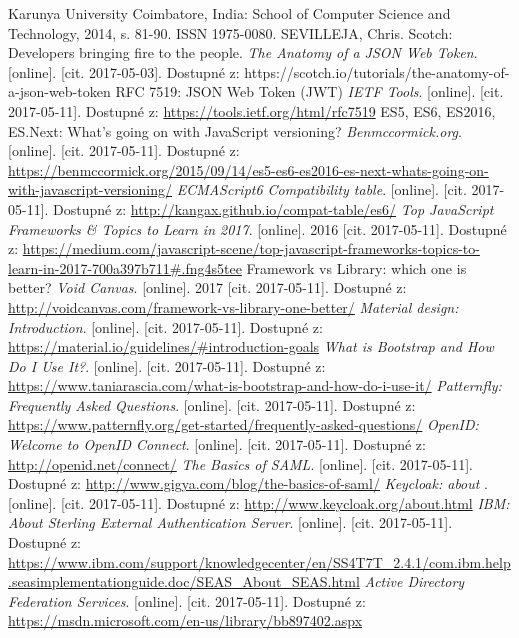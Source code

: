 \begin{thebibliography}{99}
Karunya University Coimbatore, India: School of Computer Science and Technology, 2014, s. 81-90. ISSN 1975-0080.
SEVILLEJA, Chris.
Scotch: Developers bringing fire to the people. \textit{The Anatomy of a JSON Web Token}.
[online]. [cit. 2017-05-03]. Dostupné z: https://scotch.io/tutorials/the-anatomy-of-a-json-web-token
RFC 7519: JSON Web Token (JWT)
\textit{IETF Tools}.
[online]. [cit. 2017-05-11]. Dostupné z: \url{https://tools.ietf.org/html/rfc7519}
ES5, ES6, ES2016, ES.Next: What's going on with JavaScript versioning?
\textit{Benmccormick.org}.
[online]. [cit. 2017-05-11]. Dostupné z: \url{https://benmccormick.org/2015/09/14/es5-es6-es2016-es-next-whats-going-on-with-javascript-versioning/}
\textit{ECMAScript6 Compatibility table}.
[online]. [cit. 2017-05-11]. Dostupné z: \url{http://kangax.github.io/compat-table/es6/}
\textit{Top JavaScript Frameworks \& Topics to Learn in 2017}.
[online]. 2016 [cit. 2017-05-11].  Dostupné z:  \url{https://medium.com/javascript-scene/top-javascript-frameworks-topics-to-learn-in-2017-700a397b711#.fng4s5tee}
Framework vs Library: which one is better?
\textit{Void Canvas}.
[online]. 2017 [cit. 2017-05-11]. Dostupné z: \url{http://voidcanvas.com/framework-vs-library-one-better/}
\textit{Material design: Introduction}.
[online]. [cit. 2017-05-11]. Dostupné z: \url{https://material.io/guidelines/#introduction-goals}
\textit{What is Bootstrap and How Do I Use It?}.
[online]. [cit. 2017-05-11]. Dostupné z: \url{https://www.taniarascia.com/what-is-bootstrap-and-how-do-i-use-it/}
\textit{Patternfly: Frequently Asked Questions}.
[online]. [cit. 2017-05-11]. Dostupné z: \url{https://www.patternfly.org/get-started/frequently-asked-questions/}
\textit{OpenID: Welcome to OpenID Connect}.
[online]. [cit. 2017-05-11]. Dostupné z: \url{http://openid.net/connect/}
\textit{The Basics of SAML}.
[online]. [cit. 2017-05-11]. Dostupné z: \url{http://www.gigya.com/blog/the-basics-of-saml/}
\textit{Keycloak: about }.
[online]. [cit. 2017-05-11]. Dostupné z: \url{http://www.keycloak.org/about.html}
\textit{IBM: About Sterling External Authentication Server}.
[online]. [cit. 2017-05-11]. Dostupné z: \url{https://www.ibm.com/support/knowledgecenter/en/SS4T7T_2.4.1/com.ibm.help.seasimplementationguide.doc/SEAS_About_SEAS.html}
\textit{Active Directory Federation Services}.
[online]. [cit. 2017-05-11]. Dostupné z: \url{https://msdn.microsoft.com/en-us/library/bb897402.aspx}

\end{thebibliography}
